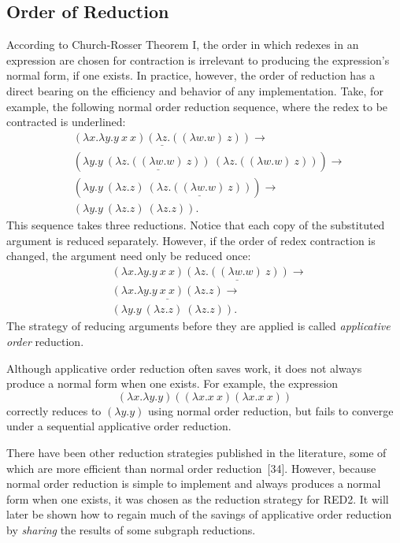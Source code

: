 \subsection{Order of Reduction}

According to Church-Rosser Theorem I, the order in which redexes in an
expression are chosen for contraction is irrelevant to producing the expression's
normal form, if one exists. In practice, however, the order of reduction has a
direct bearing on the efficiency and behavior of any \lambdacalculus{}
implementation. Take, for example, the following normal order reduction
sequence, where the redex to be contracted is underlined:
\[
\begin{aligned}
&\underline{(\lambda x.\lambda y.y\ x\ x)(\lambda z.((\lambda w.w)\ z))}
\longrightarrow\\
&(\lambda y.y\ \underline{(\lambda z.((\lambda w.w)\ z))}\ (\lambda z.((\lambda w.w)\ z)))
\longrightarrow\\
&(\lambda y.y\ (\lambda z.z)\ \underline{(\lambda z.((\lambda w.w)\ z))})
\longrightarrow\\
&(\lambda y.y\ (\lambda z.z)\ (\lambda z.z)).
\end{aligned}
\]
This sequence takes three reductions. Notice that each copy of the substituted
argument is reduced separately. However, if the order of redex contraction is
changed, the argument need only be reduced once:
\[
\begin{aligned}
&(\lambda x.\lambda y.y\ x\ x)\underline{(\lambda z.((\lambda w.w)\ z))}
\longrightarrow\\
&\underline{(\lambda x.\lambda y.y\ x\ x)(\lambda z.z)}
\longrightarrow\\
&(\lambda y.y\ (\lambda z.z)\ (\lambda z.z)).
\end{aligned}
\]
The strategy of reducing arguments before they are applied is called
\emph{applicative order} reduction.

Although applicative order reduction often saves work, it does not always
produce a normal form when one exists. For example, the expression
\[
(\lambda x.\lambda y.y)((\lambda x.x\ x)(\lambda x.x\ x))
\]
correctly reduces to \((\lambda y.y)\) using normal order reduction, but fails
to converge under a sequential applicative order reduction.

There have been other reduction strategies published in the literature, some of
which are more efficient than normal order reduction~[34]. However, because
normal order reduction is simple to implement and always produces a normal form
when one exists, it was chosen as the reduction strategy for RED2. It will later
be shown how to regain much of the savings of applicative order reduction by
\emph{sharing} the results of some subgraph reductions.

